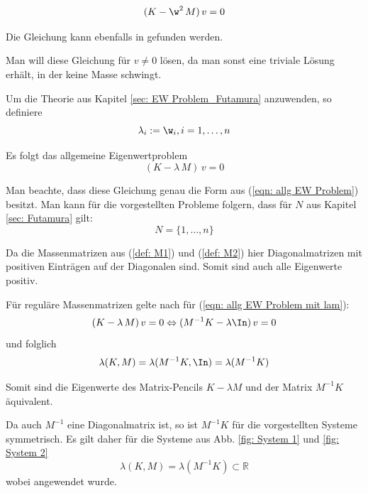 \documentclass[a4paper,12pt]{report}
\newcommand{\R}{\mathbb R}
\newcommand{\inv}{^{-1}}
\newcommand{\1}{\mathds{1}}
\theoremstyle{plain} %
\theoremstyle{definition} %
\theoremstyle{remark}
\begin{document}
            \begin{equation}
                  \label{eqn: allg EW Problem mit w}
                  (K-\w^2\,M)\,v = 0
            \end{equation}

            Die Gleichung kann ebenfalls in \cite[S. 380]{maschinendynamikDresig} gefunden werden.

            Man will diese Gleichung für $v\ne 0$ lösen, da man sonst eine triviale Lösung erhält, in der keine Masse schwingt.

            Um die Theorie aus Kapitel \ref{sec: EW Problem_Futamura} anzuwenden, so definiere
            $$\lambda_i := \w_i, i=1,\dots,n$$

            Es folgt das allgemeine Eigenwertproblem
            \begin{equation}
                  \label{eqn: allg EW Problem mit lam}
                  (K-\lambda\,M)\,v = 0
            \end{equation}

            Man beachte, dass diese Gleichung genau die Form aus (\ref{eqn: allg EW Problem}) besitzt.
            Man kann für die vorgestellten Probleme folgern, dass für $N$ aus Kapitel \ref{sec: Futamura} gilt:
            $$N=\{1,\dots,n\}$$

            Da die Massenmatrizen aus (\ref{def: M1}) und (\ref{def: M2}) hier Diagonalmatrizen mit positiven Einträgen auf der Diagonalen sind. Somit sind auch alle Eigenwerte positiv.

            Für reguläre Massenmatrizen gelte nach \cite[S. 376]{matrixGolub} für (\ref{eqn: allg EW Problem mit lam}):
            $$(K-\lambda\,M)\,v = 0 \Leftrightarrow (M\inv K-\lambda\In)\,v=0$$
            und folglich
            $$\lambda(K, M) =\lambda(M\inv K,\In) = \lambda(M\inv K)$$

            Somit sind die Eigenwerte des Matrix-Pencils $K-\lambda M$ und der Matrix $M\inv K$ äquivalent.

            Da auch $M\inv$ eine Diagonalmatrix ist, so ist $M\inv K$ für die vorgestellten Systeme symmetrisch.
            Es gilt daher für die Systeme aus Abb. \ref{fig: System 1} und \ref{fig: System 2}
            \begin{equation}
                  \label{eqn: alle Ew reell}
                  \lambda(K, M) = \lambda(M\inv K) \subset \R
            \end{equation}
            wobei \cite[S. 393]{matrixGolub} angewendet wurde.
\end{document}
